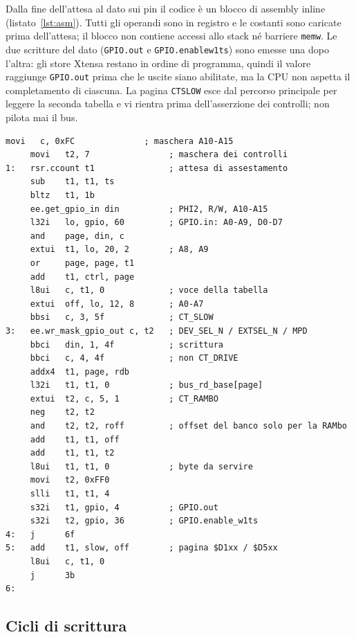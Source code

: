 \documentclass[11pt,a4paper,twoside,openright]{report}
\DeclareRobustCommand{\code}[1]{\begingroup\renewcommand{\_}{\textunderscore\allowbreak}\texttt{#1}\endgroup}
\begin{document}
Dalla fine dell'attesa al dato sui pin il codice è un blocco di assembly inline
(listato~\ref{lst:asm}). Tutti gli operandi sono in registro e le costanti sono caricate
prima dell'attesa; il blocco non contiene accessi allo stack né barriere \code{memw}. Le due
scritture del dato (\code{GPIO.out} e \code{GPIO.enable\_w1ts}) sono emesse una dopo
l'altra: gli store Xtensa restano in ordine di programma, quindi il valore raggiunge
\code{GPIO.out} prima che le uscite siano abilitate, ma la CPU non aspetta il completamento
di ciascuna. La pagina \code{CT\_SLOW} esce dal percorso principale per leggere la seconda
tabella e vi rientra prima dell'asserzione dei controlli; non pilota mai il bus.

\begin{lstlisting}[language=xtensa, caption={Percorso critico del ciclo principale (assembly inline in \code{main.cpp}).}, label={lst:asm}]
     movi   c, 0xFC              ; maschera A10-A15
     movi   t2, 7                ; maschera dei controlli
1:   rsr.ccount t1               ; attesa di assestamento
     sub    t1, t1, ts
     bltz   t1, 1b
     ee.get_gpio_in din          ; PHI2, R/W, A10-A15
     l32i   lo, gpio, 60         ; GPIO.in: A0-A9, D0-D7
     and    page, din, c
     extui  t1, lo, 20, 2        ; A8, A9
     or     page, page, t1
     add    t1, ctrl, page
     l8ui   c, t1, 0             ; voce della tabella
     extui  off, lo, 12, 8       ; A0-A7
     bbsi   c, 3, 5f             ; CT_SLOW
3:   ee.wr_mask_gpio_out c, t2   ; DEV_SEL_N / EXTSEL_N / MPD
     bbci   din, 1, 4f           ; scrittura
     bbci   c, 4, 4f             ; non CT_DRIVE
     addx4  t1, page, rdb
     l32i   t1, t1, 0            ; bus_rd_base[page]
     extui  t2, c, 5, 1          ; CT_RAMBO
     neg    t2, t2
     and    t2, t2, roff         ; offset del banco solo per la RAMbo
     add    t1, t1, off
     add    t1, t1, t2
     l8ui   t1, t1, 0            ; byte da servire
     movi   t2, 0xFF0
     slli   t1, t1, 4
     s32i   t1, gpio, 4          ; GPIO.out
     s32i   t2, gpio, 36         ; GPIO.enable_w1ts
4:   j      6f
5:   add    t1, slow, off        ; pagina $D1xx / $D5xx
     l8ui   c, t1, 0
     j      3b
6:
\end{lstlisting}

\subsection{Cicli di scrittura}
\end{document}
